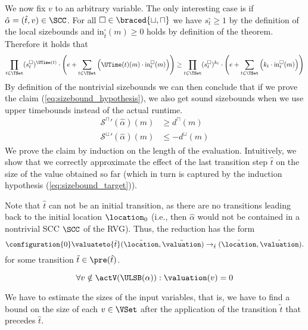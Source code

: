 We now fix $v$ to an arbitrary variable.
The only interesting case is if $\hat{\alpha} = (\hat{t}, v) \in \SCC$.
For all $\square \in \braced{\sqcup, \sqcap}$ we have $s^\square_t \geq 1$ by the definition of the local sizebounds and $\text{in}^\square_{\hat{t}}(m) \geq 0$ holds by definition of the theorem.
Therefore it holds that
\[ \prod_{t \in \TSet} (s^\square_t)^{\UTime(t)} \cdot \left( e + \sum_{t \in \TSet} \left( \UTime(t)(m) \cdot \text{in}^\square_t(m) \right) \right) \geq \prod_{t \in \TSet} (s^\square_t)^{k_t} \cdot \left( e + \sum_{t \in \TSet} \left( k_t \cdot \text{in}^\square_t(m) \right) \right) \]
By definition of the nontrivial sizebounds we can then conclude that if we prove the claim (\ref{eq:sizebound_hypothesis}), we also get sound sizebounds when we use upper timebounds instead of the actual runtime.
\begin{equation}
  \begin{split}
    {\mathcal{S}^\sqcap}'(\hat{\alpha})(m) & \geq d^\sqcap(m) \\
    {\mathcal{S}^\sqcup}'(\hat{\alpha})(m) & \leq -d^\sqcup(m)
  \end{split}
\end{equation}
We prove the claim by induction on the length of the evaluation.
Intuitively, we show that we correctly approximate the effect of the last transition step $\hat{t}$ on the size of the value obtained so far (which in turn is captured by the induction hypothesis (\ref{eq:sizebound_target})).

Note that $\hat{t}$ can not be an initial transition, as there are no transitions leading back to the initial location $\location_0$
(i.e., then $\hat{\alpha}$ would not be contained in a nontrivial SCC $\SCC$ of the RVG).
Thus, the reduction has the form
\[ \configuration{0} \valuateto{\tilde{t}} (\tilde{\location}, \tilde{\valuation}) \rightarrow_{\hat{t}} (\hat{\location}, \hat{\valuation}). \]
for some transition $\tilde{t} \in \pre(\hat{t})$.

\begin{equation} \label{eq:nonactiveequalzero}
  \forall v \notin \actV(\ULSB(\alpha)): \valuation(v) = 0
\end{equation}

We have to estimate the sizes of the input variables,
that is, we have to find a bound on the size of each $v \in \VSet$ after the application of the transition $\tilde{t}$ that precedes $\hat{t}$.


